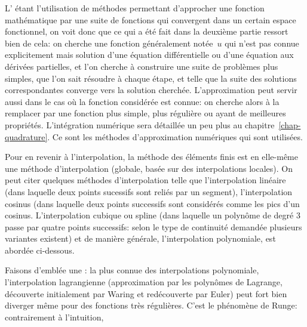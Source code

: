 L' étant l'utilisation de méthodes permettant d'approcher une fonction mathématique par une suite de fonctions qui convergent dans un certain espace fonctionnel, on voit donc que ce qui a été fait dans la deuxième partie ressort bien de cela: on cherche une fonction généralement notée~$u$ qui n'est pas connue explicitement mais solution d'une équation différentielle ou d'une équation aux dérivées partielles, et l'on cherche à construire une suite de problèmes plus simples, que l'on sait résoudre à chaque étape, et telle que la suite des solutions correspondantes converge vers la solution cherchée. L'approximation peut servir aussi dans le cas où la fonction considérée est connue: on cherche alors à la remplacer par une fonction plus simple, plus régulière ou ayant de meilleures propriétés. L'intégration numérique sera détaillée un peu plus au chapitre~\ref{chap-quadrature}. Ce sont les méthodes d'approximation numériques qui sont utilisées. 

Pour en revenir à l'interpolation, la méthode des éléments finis est en elle-même une méthode d'interpolation (globale, basée sur des interpolations locales). On peut citer quelques méthodes d'interpolation telle que l'interpolation linéaire (dans laquelle deux points sucessifs sont reliés par un segment), l'interpolation cosinus (dans laquelle deux points successifs sont considérés comme les pics d'un cosinus. L'interpolation cubique ou spline (dans laquelle un polynôme de degré 3 passe par quatre points successifs: selon le type de continuité demandée plusieurs variantes existent) et de manière générale, l'interpolation polynomiale, est abordée ci-dessous. 

Faisons d'emblée une : la plus connue des interpolations polynomiale, l'interpolation lagrangienne (approximation par les polynômes de Lagrange, découverte initialement par Waring et redécouverte par Euler) peut fort bien diverger même pour des fonctions très régulières. C'est le phénomène de Runge: contrairement à l'intuition, 

